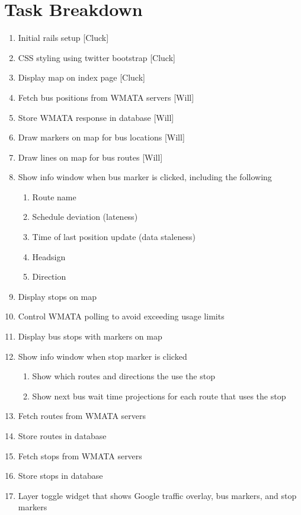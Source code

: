 \documentclass[12pt]{article}
\begin{document}
\section*{Task Breakdown}
\begin{enumerate}
\item Initial rails setup [Cluck]
\item CSS styling using twitter bootstrap [Cluck]
\item Display map on index page [Cluck]
\item Fetch bus positions from WMATA servers [Will]
\item Store WMATA response in database [Will]
\item Draw markers on map for bus locations [Will]
\item Draw lines on map for bus routes [Will]
\item Show info window when bus marker is clicked, including the following
\begin{enumerate}
\item Route name
\item Schedule deviation (lateness)
\item Time of last position update (data staleness)
\item Headsign
\item Direction
\end{enumerate}
\item Display stops on map
\item Control WMATA polling to avoid exceeding usage limits
\item Display bus stops with markers on map
\item Show info window when stop marker is clicked
	\begin{enumerate}
		\item Show which routes and directions the use the stop
		\item Show next bus wait time projections for each route that uses the stop
	\end{enumerate}
\item Fetch routes from WMATA servers
\item Store routes in database
\item Fetch stops from WMATA servers
\item Store stops in database
\item Layer toggle widget that shows Google traffic overlay, bus markers, and stop markers
\end{enumerate}
\end{document}
